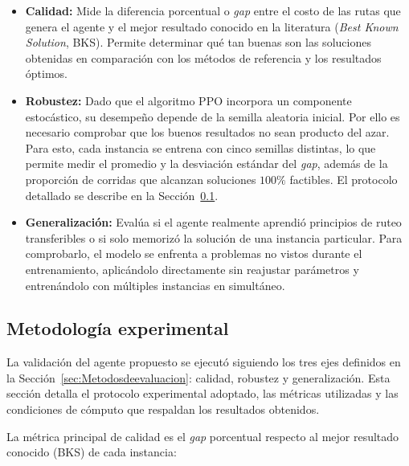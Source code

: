 \begin{itemize}
    \item \textbf{Calidad:} Mide la diferencia porcentual o \emph{gap} entre el costo de las rutas que genera el agente y el mejor resultado conocido en la literatura (\emph{Best Known Solution}, BKS). Permite determinar qué tan buenas son las soluciones obtenidas en comparación con los métodos de referencia y los resultados óptimos.

    \item \textbf{Robustez:} Dado que el algoritmo PPO incorpora un componente estocástico, su desempeño depende de la semilla aleatoria inicial. Por ello es necesario comprobar que los buenos resultados no sean producto del azar. Para esto, cada instancia se entrena con cinco semillas distintas, lo que permite medir el promedio y la desviación estándar del \emph{gap}, además de la proporción de corridas que alcanzan soluciones $100\%$ factibles. El protocolo detallado se describe en la Sección~\ref{sec:metodologiaexp}.

    \item \textbf{Generalización:} Evalúa si el agente realmente aprendió principios de ruteo transferibles o si solo memorizó la solución de una instancia particular. Para comprobarlo, el modelo se enfrenta a problemas no vistos durante el entrenamiento, aplicándolo directamente sin reajustar parámetros y entrenándolo con múltiples instancias en simultáneo.
\end{itemize}


\subsection{Metodología experimental} \label{sec:metodologiaexp}
La validación del agente propuesto se ejecutó siguiendo los tres ejes definidos en la Sección~\ref{sec:Metodosdeevaluacion}: calidad, robustez y generalización. Esta sección detalla el protocolo experimental adoptado, las métricas utilizadas y las condiciones de cómputo que respaldan los resultados obtenidos.

La métrica principal de calidad es el \emph{gap} porcentual respecto al mejor resultado conocido (BKS) de cada instancia:

